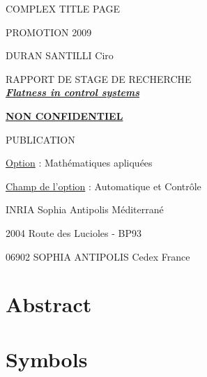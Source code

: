 \documentclass[12pt]{article}
\begin{document}
    \begin{titlepage}
        COMPLEX TITLE PAGE

        PROMOTION 2009

        DURAN SANTILLI Ciro

        \vspace{40 mm}

        \begin{center}

        {\large RAPPORT DE STAGE DE RECHERCHE}\\[0.5cm]

        \underline{ \large \bfseries \itshape Flatness in control systems}

        \vspace{10 mm}

        \underline{ \bfseries NON CONFIDENTIEL }

        PUBLICATION

        \end{center}

        \vspace{40 mm}

        \underline{Option} : Mathématiques apliquées

        \underline{Champ de l'option} : Automatique et Contrôle

        \vspace{5 mm}

        INRIA Sophia Antipolis Méditerrané

        2004 Route des Lucioles - BP93

        06902 SOPHIA ANTIPOLIS Cedex France
    \end{titlepage}

    \newpage

\section{Abstract} \label{abstract}

    \begin{abstract}
    \end{abstract}
    \newpage

\section{Symbols}\label{symbols}
\end{document}
